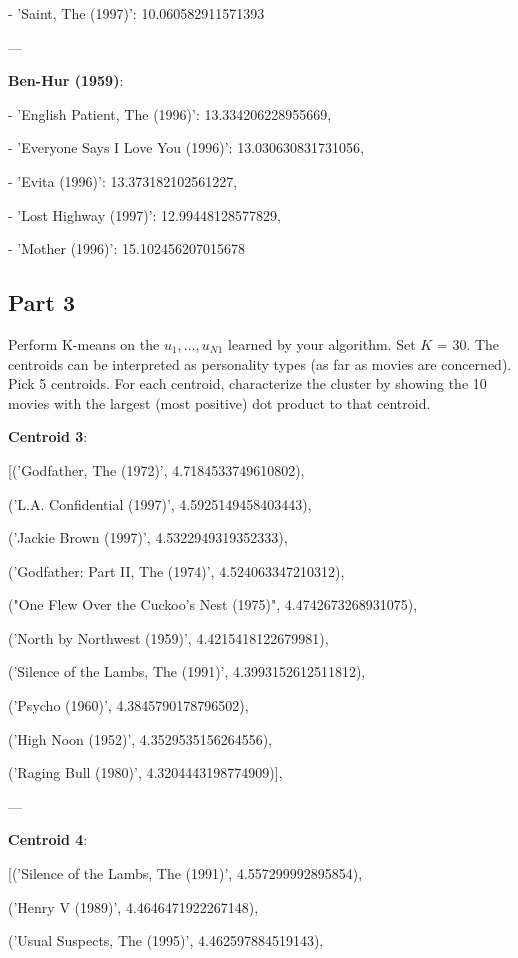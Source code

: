 \documentclass[11pt]{article}
\begin{document}
- 'Saint, The (1997)': 10.060582911571393
 
 ---
 
\textbf{Ben-Hur (1959)}:

- 'English Patient, The (1996)': 13.334206228955669,

- 'Everyone Says I Love You (1996)': 13.030630831731056,

- 'Evita (1996)': 13.373182102561227,

- 'Lost Highway (1997)': 12.99448128577829,

- 'Mother (1996)': 15.102456207015678

\subsection*{Part 3}

Perform K-means on the $u_1, . . . , u_{N1}$ learned by your algorithm. Set $K$ = 30. The centroids can be interpreted as personality types (as far as movies are concerned). Pick 5 centroids. For each centroid, characterize the cluster by showing the 10 movies with the largest (most positive) dot product to that centroid.	

\textbf{Centroid 3}:

[('Godfather, The (1972)', 4.7184533749610802),

     ('L.A. Confidential (1997)', 4.5925149458403443),
     
     ('Jackie Brown (1997)', 4.5322949319352333),
 
     ('Godfather: Part II, The (1974)', 4.524063347210312),
 
     ("One Flew Over the Cuckoo's Nest (1975)", 4.4742673268931075),
 
     ('North by Northwest (1959)', 4.4215418122679981),
 
     ('Silence of the Lambs, The (1991)', 4.3993152612511812),
 
     ('Psycho (1960)', 4.3845790178796502),
 
     ('High Noon (1952)', 4.3529535156264556),
 
     ('Raging Bull (1980)', 4.3204443198774909)],
     
     ---
     
\textbf{Centroid 4}:
 
 [('Silence of the Lambs, The (1991)', 4.557299992895854),
 
     ('Henry V (1989)', 4.4646471922267148),
 
     ('Usual Suspects, The (1995)', 4.462597884519143),
 
\end{document}
